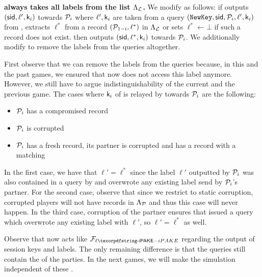 \begin{games}
\textbf{\Func always takes all labels from the list $\Lambda_{\mathcal{L}}$.}
We modify \Func as follows: if \Func outputs $(\mathsf{sid},\ell',\mathsf{k}_{i})$ towards $\mathcal{P}_{i}$ where $\ell',\mathsf{k}_{i}$ are taken from a query $(\texttt{NewKey},\mathsf{sid},\mathcal{P}_{i},\ell',\mathsf{k}_{i})$ from \Sim, \Func extracts $\ell^*$ from a record $(\mathcal{P}_{1-i},\ell^*)$ in $\Lambda_{\mathcal{L}}$ or sets $\ell^*\gets\bot$ if such a record does not exist. \Func then outputs $(\mathsf{sid},\ell^*,\mathsf{k}_{i})$ towards $\mathcal{P}_{i}$. We additionally modify \Sim to remove the labels from the \NewKey queries altogether.

First observe that we can remove the labels from the \NewKey queries because, in this and the past games, we ensured that \Func now does not access this label anymore. However, we still have to argue indistinguishability of the current and the previous game. The cases where $\mathsf{k}_{i}$ of \Sim is relayed by \Func towards $\mathcal{P}_{i}$ are the following:
\begin{itemize}
 \item $\mathcal{P}_{i}$ has a compromised record
 \item $\mathcal{P}_{i}$ is corrupted
 \item $\mathcal{P}_{i}$ has a fresh record, its partner is corrupted and has a record with a matching \password
\end{itemize}
In the first case, we have that $\ell'=\ell^*$ since the label $\ell'$ outputted by $\mathcal{P}_{i}$ was also contained in a \TestPwd query by \Sim and overwrote any existing label send by $\mathcal{P}_{i}$'s partner. For the second case, observe that since we restrict to static corruption, corrupted players will not have records in $\Lambda_{\mathcal{P}}$ and thus this case will never happen. 
In the third case, corruption of the partner ensures that \Sim issued a \TestPwd query which overwrote any existing label with $\ell'$, so $\ell'=\ell^*$ as well.

Observe that now \Func acts like $\FliPAKE$ regarding the output of session keys and labels. The only remaining difference is that the \NewSession queries still contain the \passwords of the parties. In the next games, we will make the simulation independent of these \passwords.


\end{games}
